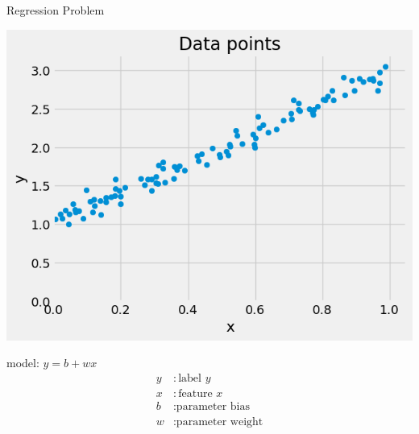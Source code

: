 \documentclass[pdflatex,compress,mathserif]{beamer}
\begin{document}
\begin{frame}{Regression Problem}
	\begin{multicols}{2}
		\begin{center}
			\includegraphics[width=\linewidth]{img/01}
		\end{center}
		\columnbreak
		model:
		$y = b + wx$
		\begin{align*}
			y &: \text{label } y \\
			x &: \text{feature } x \\
			b &: \text{parameter bias} \\
			w &: \text{parameter weight}
		\end{align*}
		\vfill\null
	\end{multicols}
\end{frame}
\end{document}
